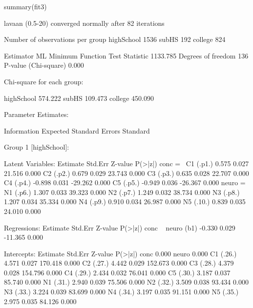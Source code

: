 \begin{Schunk}
\begin{Sinput}
 summary(fit3)
\end{Sinput}
\begin{Soutput}
lavaan (0.5-20) converged normally after  82 iterations

  Number of observations per group         
  highSchool                                      1536
  subHS                                            192
  college                                          824

  Estimator                                         ML
  Minimum Function Test Statistic             1133.785
  Degrees of freedom                               136
  P-value (Chi-square)                           0.000

Chi-square for each group:

  highSchool                                   574.222
  subHS                                        109.473
  college                                      450.090

Parameter Estimates:

  Information                                 Expected
  Standard Errors                             Standard


Group 1 [highSchool]:

Latent Variables:
                   Estimate  Std.Err  Z-value  P(>|z|)
  conc =~                                             
    C1      (.p1.)    0.575    0.027   21.516    0.000
    C2      (.p2.)    0.679    0.029   23.743    0.000
    C3      (.p3.)    0.635    0.028   22.707    0.000
    C4      (.p4.)   -0.898    0.031  -29.262    0.000
    C5      (.p5.)   -0.949    0.036  -26.367    0.000
  neuro =~                                            
    N1      (.p6.)    1.307    0.033   39.323    0.000
    N2      (.p7.)    1.249    0.032   38.734    0.000
    N3      (.p8.)    1.207    0.034   35.334    0.000
    N4      (.p9.)    0.910    0.034   26.987    0.000
    N5      (.10.)    0.839    0.035   24.010    0.000

Regressions:
                   Estimate  Std.Err  Z-value  P(>|z|)
  conc ~                                              
    neuro     (b1)   -0.330    0.029  -11.365    0.000

Intercepts:
                   Estimate  Std.Err  Z-value  P(>|z|)
    conc              0.000                           
    neuro             0.000                           
    C1      (.26.)    4.571    0.027  170.418    0.000
    C2      (.27.)    4.442    0.029  152.673    0.000
    C3      (.28.)    4.379    0.028  154.796    0.000
    C4      (.29.)    2.434    0.032   76.041    0.000
    C5      (.30.)    3.187    0.037   85.740    0.000
    N1      (.31.)    2.940    0.039   75.506    0.000
    N2      (.32.)    3.509    0.038   93.434    0.000
    N3      (.33.)    3.224    0.039   83.699    0.000
    N4      (.34.)    3.197    0.035   91.151    0.000
    N5      (.35.)    2.975    0.035   84.126    0.000


\end{Soutput}
\end{Schunk}
